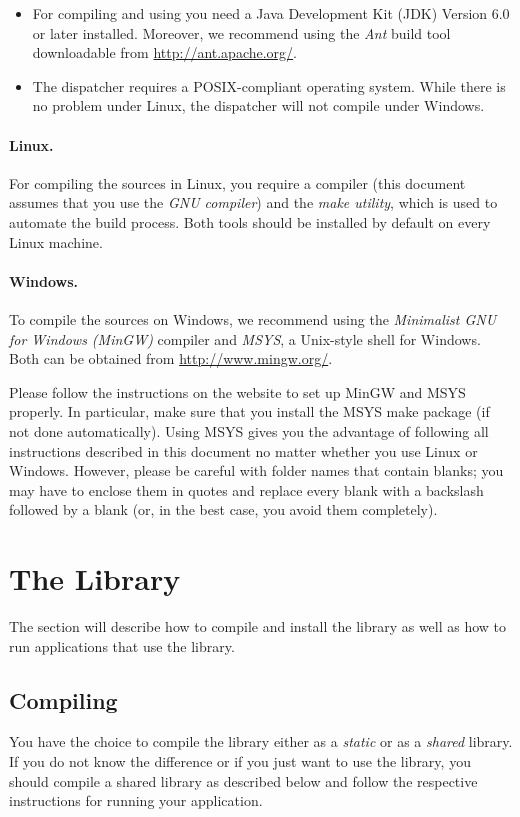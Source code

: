 \begin{itemize}
  \item For compiling and using \jalf you need a Java Development Kit (JDK) Version 6.0 or later installed. Moreover, we recommend using the \emph{Ant} build tool downloadable from \url{http://ant.apache.org/}.
  \item The dispatcher requires a POSIX-compliant operating system. While there is no problem under Linux, the dispatcher will not compile under Windows.
\end{itemize}

\paragraph{Linux.}
For compiling the \cpp sources in Linux, you require a \cpp compiler (this document assumes that you use the \emph{GNU \cpp compiler}) and the \emph{make utility}, which is used to automate the build process. Both tools should be installed by default on every Linux machine.

\paragraph{Windows.}
To compile the \cpp sources on Windows, we recommend using the \emph{Minimalist GNU for Windows (MinGW)} compiler and \emph{MSYS}, a Unix-style shell for Windows. Both can be obtained from \url{http://www.mingw.org/}. 

Please follow the instructions on the website to set up MinGW and MSYS properly. In particular, make sure that you install the MSYS make package (if not done automatically). Using MSYS gives you the advantage of following all instructions described in this document no matter whether you use Linux or Windows. However, please be careful with folder names that contain blanks; you may have to enclose them in quotes and replace every blank with a backslash followed by a blank (or, in the best case, you avoid them completely).

\section{\texorpdfstring{The \libalf \cpp Library}{The \libalf C++ Library}}\label{sec:install_libalf}
The section will describe how to compile and install the library as well as how to run applications that use the library.

\subsection{Compiling \libalf}
You have the choice to compile the \libalf library either as a \emph{static} or as a \emph{shared} library. If you do not know the difference or if you just want to use the library, you should compile a shared library as described below and follow the respective instructions for running your application.

